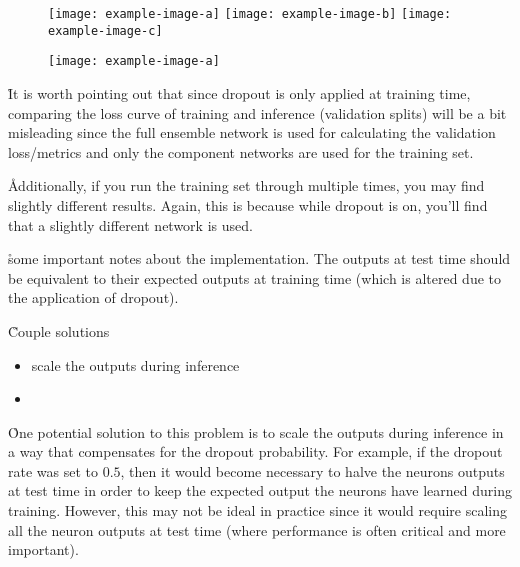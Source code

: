 \begin{figure}[htp]
	\centering
	\texttt{[image: example-image-a]}\hfil
	\texttt{[image: example-image-b]}\hfil
	\texttt{[image: example-image-c]}\hfil
	\caption{}
	\label{fig:regularization_dropout_overview_training}
\end{figure}

\begin{figure}[htp]
	\centering
	\texttt{[image: example-image-a]}\hfil
	\caption{}
	\label{fig:regularization_dropout_overview_test}
\end{figure}

\r{It is worth pointing out that since dropout is only applied at training time, comparing the loss curve of training and inference (validation splits) will be a bit misleading since the full ensemble network is used for calculating the validation loss/metrics and only the component  networks are used for the training set.}

\r{Additionally, if you run the training set through multiple times, you may find slightly different results. Again, this is because while dropout is on, you'll find that a slightly different network is used. }

\r{some important notes about the implementation. The outputs at test time should be equivalent to their expected outputs at training time (which is altered due to the application of dropout).}

\r{Couple solutions}
\begin{itemize}[noitemsep,topsep=0pt]
	\item scale the outputs during inference
	\item
\end{itemize}

\r{One potential solution to this problem is to scale the outputs during inference in a way that compensates for the dropout probability.  For example, if the dropout rate was set to $0.5$, then it would become necessary to halve the neurons outputs at test time in order to keep the expected output the neurons have learned during training.  However, this may not be ideal in practice since it would require scaling all the neuron outputs at test time (where performance is often critical and more important).}

